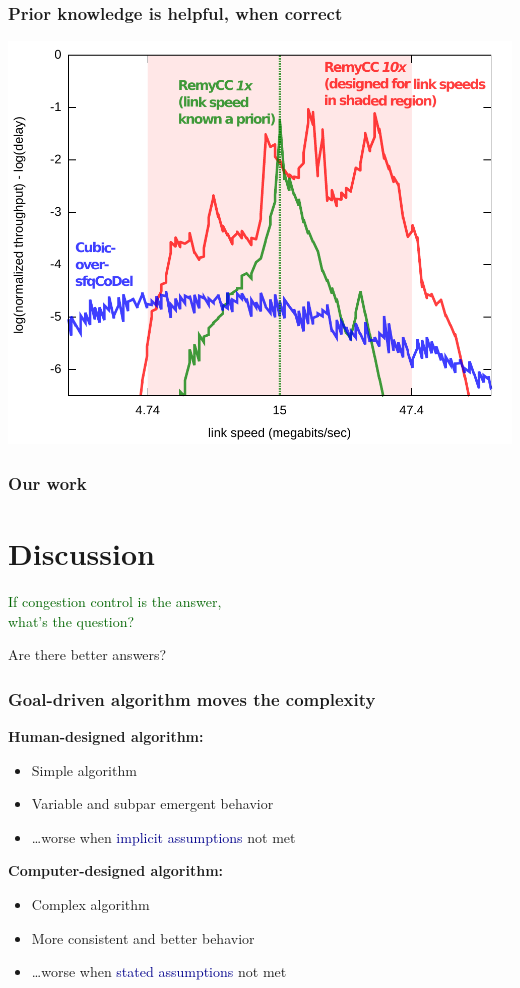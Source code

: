 \documentclass[svgnames]{beamer}
\begin{document}
\begin{frame}
\frametitle{Prior knowledge is helpful, when correct}

\noindent \includegraphics[width=8.5 cm]{spec2.pdf}

\end{frame}

\begin{frame}

\frametitle{Our work}
\section{Discussion}

\begin{centering}

\LARGE \textcolor{DarkGreen}{If congestion control is the answer,\\what's the question?}

\vspace{\baselineskip}

\LARGE \textcolor{NavyBlue}{Are there better answers?}

\end{centering}

\end{frame}

\begin{frame}
\frametitle{Goal-driven algorithm \textbf{moves} the complexity}

\textbf{Human-designed algorithm:}

\begin{itemize}
\item Simple algorithm
\item Variable and subpar emergent behavior
\item[] \ldots worse when \textcolor{DarkBlue}{implicit assumptions} not met
\end{itemize}

\textbf{Computer-designed algorithm:}

\begin{itemize}
\item Complex algorithm
\item More consistent and better behavior
\item[] \ldots worse when \textcolor{DarkBlue}{stated assumptions} not met
\end{itemize}

\end{frame}
\end{document}
